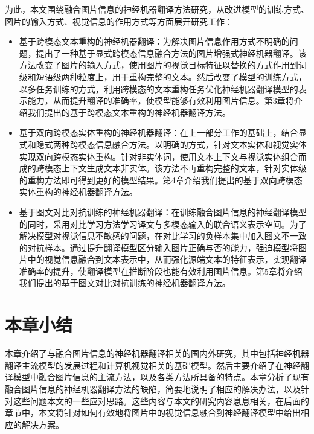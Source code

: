 为此，本文围绕融合图片信息的神经机器翻译方法研究，从改进模型的训练方式、图片的输入方式、视觉信息的作用方式等方面展开研究工作：
\begin{itemize}
    \item {\sffamily 基于跨模态文本重构的神经机器翻译：}为解决图片信息作用方式不明确的问题，提出了一种基于显式跨模态信息融合方法的图片增强式神经机器翻译。该方法改变了图片的输入方式，使用图片的视觉目标特征以替换的方式作用到词级和短语级两种粒度上，用于重构完整的文本。然后改变了模型的训练方式，以多任务训练的方式，利用跨模态的文本重构任务优化神经机器翻译模型的表示能力，从而提升翻译的准确率，使模型能够有效利用图片信息。第3章将介绍我们提出的基于跨模态文本重构的神经机器翻译方法。
    \item {\sffamily 基于双向跨模态实体重构的神经机器翻译：}在上一部分工作的基础上，结合显式和隐式两种跨模态信息融合方法。以明确的方式，针对文本实体和视觉实体实现双向跨模态实体重构。针对非实体词，使用文本上下文与视觉实体组合而成的跨模态上下文生成文本非实体。该方法不再重构完整的文本，针对实体级的重构方法即可得到更好的模型结果。第4章介绍我们提出的基于双向跨模态实体重构的神经机器翻译方法。
    \item {\sffamily 基于图文对比对抗训练的神经机器翻译：}在训练融合图片信息的神经翻译模型的同时，采用对比学习方法学习译文与多模态输入的联合语义表示空间。为了解决模型对视觉信息不敏感的问题，在对比学习的负样本集中加入图文不一致的对抗样本。通过提升翻译模型区分输入图片正确与否的能力，强迫模型将图片中的视觉信息融合到文本表示中，从而强化源端文本的特征表示，实现翻译准确率的提升，使翻译模型在推断阶段也能有效利用图片信息。第5章将介绍我们提出的基于图文对比对抗训练的神经机器翻译方法。
\end{itemize}

\section{本章小结}
本章介绍了与融合图片信息的神经机器翻译相关的国内外研究，其中包括神经机器翻译主流模型的发展过程和计算机视觉相关的基础模型。然后主要介绍了在神经翻译模型中融合图片信息的主流方法，以及各类方法所具备的特点。本章分析了现有融合图片信息的神经机器翻译方法的缺陷，简要地说明了相应的解决办法，以及针对这些问题本文的一些应对思路。这些内容与本文的研究内容息息相关，在后面的章节中，本文将针对如何有效地将图片中的视觉信息融合到神经翻译模型中给出相应的解决方案。

